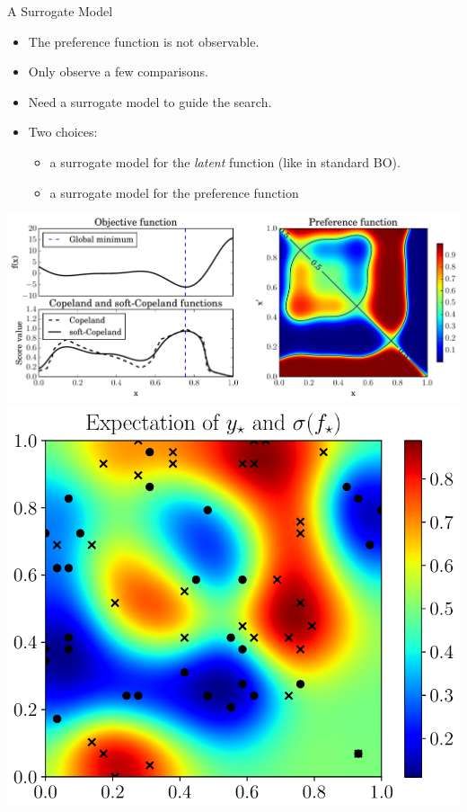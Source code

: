 \documentclass[13pt,aspectratio=1610]{beamer}
\begin{document}
\begin{frame}{A Surrogate Model}
\begin{minipage}{0.65\textwidth}

\begin{itemize}
\item The preference function is not observable.
\item Only observe a few comparisons. 
\item Need a surrogate model to guide the search.
\item Two choices:
\begin{itemize}
\item  a surrogate model for the \emph{latent} function (like in standard BO). \citep{Brochu:2010, GuoEtAl2010}
\item a surrogate model for the preference function
 \end{itemize}
\end{itemize}
\end{minipage}
%
\begin{minipage}{0.33\textwidth}
\centering 
\includegraphics[width=1\textwidth]{duel_space.pdf} \\
\includegraphics[width=.93\textwidth]{exp_y_star_cropped.pdf} 
\end{minipage}
\end{frame}
\end{document}

